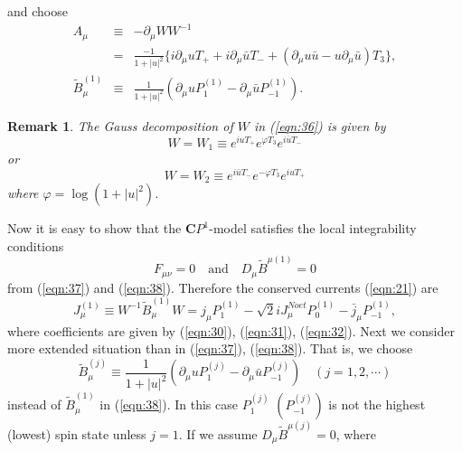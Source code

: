 \documentclass[makeidx,12pt,openany]{report}
\newtheorem{rmk}[df]{Remark}
\begin{document}
and choose  
\begin{eqnarray}
 A_{\mu} & \equiv & -\partial_{\mu}W W^{-1} \nonumber\\
         & = & \frac{-1}{1+|u|^2}
               \{ i\partial_{\mu}u T_{+}+i\partial_{\mu}\bar{u} T_{-}+
                  (\partial_{\mu}u \bar{u}-u\partial_{\mu}\bar{u})T_3 \}, 
 \label{eqn:37}\\
 \tilde{B}_{\mu}^{(1)} & \equiv & \frac{1}{1+|u|^2}
             (\partial_{\mu}u P_1^{(1)}-\partial_{\mu}\bar{u} P_{-1}^{(1)}).
 \label{eqn:38}
\end{eqnarray}
\begin{rmk}
The Gauss decomposition of $W$ in (\ref{eqn:36}) is given by 
\begin{equation}
 W=W_1 \equiv e^{iuT_{+}}e^{\varphi T_3}e^{i\bar{u}T_{-}}
 \label{eqn:W1}
\end{equation}
or
\begin{equation}
 W=W_2 \equiv e^{i\bar{u}T_{-}}e^{-\varphi T_3}e^{iuT_{+}}
 \label{eqn:W2}
\end{equation}
where $\varphi = \log{(1+|u|^2)}$. 
\end{rmk}
Now it is easy to show that the $\mathbf{C}P^1$-model satisfies the local 
integrability conditions 
\begin{equation}
 F_{\mu \nu}=0 \quad \mbox{and} \quad D_{\mu}\tilde{B}^{\mu (1)}=0 
\end{equation}
from (\ref{eqn:37}) and (\ref{eqn:38}). Therefore the conserved currents 
(\ref{eqn:21}) are
\begin{equation}
 J_{\mu}^{(1)} \equiv W^{-1} \tilde{B}_{\mu}^{(1)} W 
               = j_{\mu}P_1^{(1)}-\sqrt{2}iJ_{\mu}^{Noet}P_0^{(1)}
                         -\bar{j}_{\mu}P_{-1}^{(1)}, 
\end{equation}
where coefficients are given by (\ref{eqn:30}), (\ref{eqn:31}), (\ref{eqn:32}). 
Next we consider more extended situation than in (\ref{eqn:37}), (\ref{eqn:38}). 
That is, we choose 
\begin{equation}
 \tilde{B}_{\mu}^{(j)} \equiv \frac{1}{1+|u|^2}
             (\partial_{\mu}u P_1^{(j)}-\partial_{\mu}\bar{u} P_{-1}^{(j)})
  \quad (j=1,2,\cdots )
\label{eqn:Bmu-j}
\end{equation}
instead of $\tilde{B}_{\mu}^{(1)}$ in (\ref{eqn:38}). In this case 
$P_1^{(j)}$ $(P_{-1}^{(j)})$ is not the highest (lowest) spin state 
unless $j=1$. 
If we assume $D_{\mu}\tilde{B}^{\mu (j)}=0$, where
\end{document}
